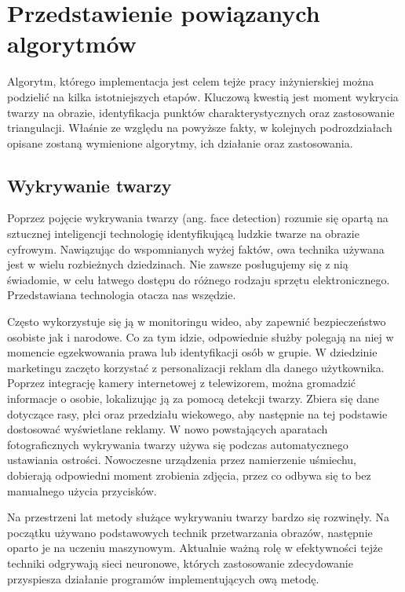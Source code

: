 \chapter{Przedstawienie powiązanych algorytmów}
\label{cha:analizaTeoretycznaProblemu}
Algorytm, którego implementacja jest celem tejże pracy inżynierskiej można podzielić na kilka istotniejszych etapów. Kluczową kwestią jest moment wykrycia twarzy na obrazie, identyfikacja punktów charakterystycznych oraz zastosowanie triangulacji. Właśnie ze względu na  powyższe fakty, w kolejnych podrozdziałach opisane zostaną wymienione algorytmy, ich działanie oraz zastosowania. 


\section{Wykrywanie twarzy}
Poprzez pojęcie wykrywania twarzy (ang. face detection) \cite{fDetection} rozumie się opartą na sztucznej inteligencji technologię identyfikującą ludzkie twarze na obrazie cyfrowym. Nawiązując do wspomnianych wyżej faktów, owa technika używana jest w wielu rozbieżnych dziedzinach. Nie zawsze posługujemy się z nią świadomie, w celu łatwego dostępu do różnego rodzaju sprzętu elektronicznego. Przedstawiana technologia otacza nas wszędzie.

Często wykorzystuje się ją w monitoringu wideo, aby zapewnić bezpieczeństwo osobiste jak i narodowe. Co za tym idzie, odpowiednie służby polegają na niej w momencie egzekwowania prawa lub identyfikacji osób w grupie. W dziedzinie marketingu zaczęto korzystać z personalizacji reklam dla danego użytkownika. Poprzez integrację kamery internetowej z telewizorem, można gromadzić informacje o osobie, lokalizując ją za pomocą detekcji twarzy. Zbiera się dane dotyczące rasy, płci oraz przedziału wiekowego, aby następnie na tej podstawie dostosować wyświetlane reklamy. W nowo powstających aparatach fotograficznych wykrywania twarzy używa się podczas automatycznego ustawiania ostrości. Nowoczesne urządzenia przez namierzenie uśmiechu, dobierają odpowiedni moment zrobienia zdjęcia, przez co odbywa się to bez manualnego użycia przycisków. \cite{fDetection2}

Na przestrzeni lat metody służące wykrywaniu twarzy bardzo się rozwinęły. Na początku używano podstawowych technik przetwarzania obrazów, następnie oparto je na uczeniu maszynowym. Aktualnie ważną rolę w efektywności tejże techniki odgrywają sieci neuronowe, których zastosowanie zdecydowanie przyspiesza działanie programów implementujących ową metodę.

